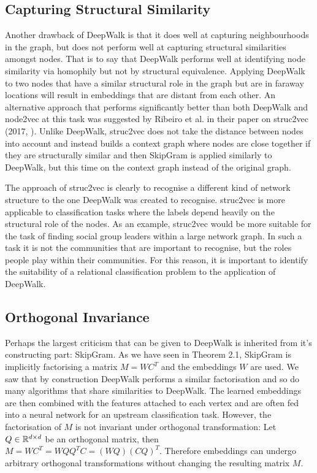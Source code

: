 \documentclass[a4paper]{article}
\begin{document}
\subsection{Capturing Structural Similarity}
Another drawback of DeepWalk is that it does well at capturing neighbourhoods in the graph, but does not perform well
at capturing structural similarities amongst nodes. That is to say that DeepWalk
performs well at identifying node similarity via homophily but not by structural equivalence. Applying DeepWalk to two nodes
that have a similar structural role in the graph but are in faraway locations
will result in embeddings that are distant from each other. An alternative
approach that performs significantly better than both DeepWalk and node2vec at this task was suggested by
Ribeiro et al. in their paper on struc2vec (2017, \cite{ribeiro2017}). Unlike DeepWalk, struc2vec does not
take the distance between nodes into account and instead builds a context graph
where nodes are close together if they are structurally similar and then
SkipGram is applied similarly to DeepWalk, but this time on the
context graph instead of the original graph.

The approach of struc2vec is clearly to recognise a different kind of network
structure to the one DeepWalk was created to recognise. struc2vec is more
applicable to classification tasks where the labels depend heavily on the
structural role of the nodes. As an example, struc2vec would be more suitable
for the task of finding social group leaders within a large network
graph. In such a task it is not the communities that are important to recognise,
but the roles people play within their communities. For this reason, it is
important to identify the suitability of a relational classification problem to
the application of DeepWalk.
\subsection{Orthogonal Invariance}
Perhaps the largest criticism that can be given to DeepWalk is inherited from it's constructing part: SkipGram. As we have
seen in Theorem 2.1, SkipGram is implicitly factorising a matrix $M = WC^T$ and the embeddings $W$ are used. We saw that
by construction DeepWalk performs a similar factorisation and so do many algorithms that share similarities to DeepWalk. The
learned embeddings are then combined with the features attached to each vertex and are often fed into a neural network for an
upstream classification task. However, the factorisation of $M$ is not invariant under orthogonal transformation: Let $Q \in \R^{d \times d}$
be an orthogonal matrix, then $M = WC^T = WQQ^TC = (WQ)(CQ)^T$. Therefore embeddings can undergo arbitrary orthogonal transformations
without changing the resulting matrix $M$.
\end{document}
